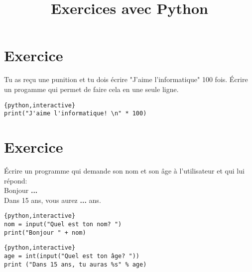 \documentclass[a4paper,11pt]{article}
\begin{document}
\title{Exercices avec Python}
\date{}
\maketitle

\section{Exercice}
Tu as reçu une punition et tu dois écrire "J'aime l'informatique" 100 fois.
Écrire un progamme qui permet de faire cela en une seule ligne.
\begin{solution}
\begin{verbatim}{python,interactive}
print("J'aime l'informatique! \n" * 100)
\end{verbatim}
\end{solution}


\section{Exercice}
Écrire un programme qui demande son nom et son âge à l'utilisateur et qui lui répond:\\
Bonjour \textbf{...}\\
Dans 15 ans, vous aurez \textbf{...} ans.\\
\begin{solution}
\begin{verbatim}{python,interactive}
nom = input("Quel est ton nom? ")
print("Bonjour " + nom)
\end{verbatim}
\end{solution}

\begin{solution}
\begin{verbatim}{python,interactive}
age = int(input("Quel est ton âge? "))
print ("Dans 15 ans, tu auras %s" % age)
\end{verbatim}
\end{solution}
\end{document}
